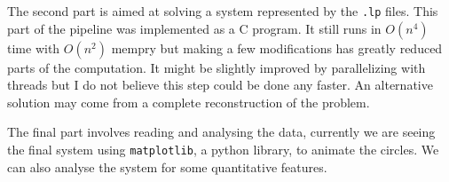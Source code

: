 \documentclass{article}
\begin{document}
The second part is aimed at solving a system represented by the \texttt{.lp}
files. This part of the pipeline was implemented as a C program. It still
runs in $O(n^4)$ time with $O(n^2)$ mempry but making a few modifications has
greatly reduced parts of the computation. It might be slightly improved by
parallelizing with threads but I do not believe this step could be done
any faster. An alternative solution may come from a complete reconstruction
of the problem.

The final part involves reading and analysing the data, currently we are
seeing the final system using \texttt{matplotlib}, a python library, to animate
the circles. We can also analyse the system for some quantitative features.
\end{document}
